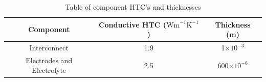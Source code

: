 
\begin{table}[h!]
\centering
\caption{Table of component HTC's and thicknesses \cite{LM11} \cite{LM12}}
\label{tbl:HTCcoeff}
\begin{tabular}{|c|c|c|}
\hline
\textbf{Component}         & \textbf{Conductive HTC ($\text{Wm}^{-1}\text{K}^{-1}$)} & \textbf{Thickness (m)}     \\ \hline
Interconnect               & 1.9                               & 1$\times \mathrm{10^{-3}}$   \\ \hline
Electrodes and Electrolyte & 2.5                               & 600$\times \mathrm{10^{-6}}$ \\ \hline
\end{tabular}
\end{table}


